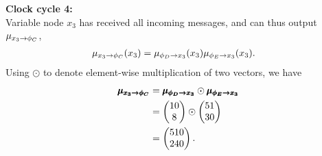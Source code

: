 \begin{exenumerate}
\begin{solution}
      { \bf Clock cycle 4:}\\
      Variable node $x_3$ has received all incoming messages, and can thus output $\xfmess{x_3}{\phi_C}{1}$,
      \begin{align}
        \xfmess{x_3}{\phi_C}{1}(x_3) & = \fxmess{\phi_D}{x_3}{1}(x_3)\fxmess{\phi_E}{x_3}{1}(x_3).
      \end{align}
      Using $\odot$ to denote element-wise multiplication of two vectors, we have 
      \begin{align}
        \pmb{\mu_{{x_3\rightarrow \phi_C}}} & = \pmb{\mu_{{\phi_D\rightarrow x_3}}} \odot \pmb{\mu_{{\phi_E\rightarrow x_3}}}\\
        & = \begin{pmatrix}
        10 \\
        8
        \end{pmatrix}
        \odot
        \begin{pmatrix}
          51 \\
          30 \\
        \end{pmatrix}\\
        & = \begin{pmatrix}
          510 \\
          240
        \end{pmatrix}.
      \end{align}


\end{solution}
\end{exenumerate}
